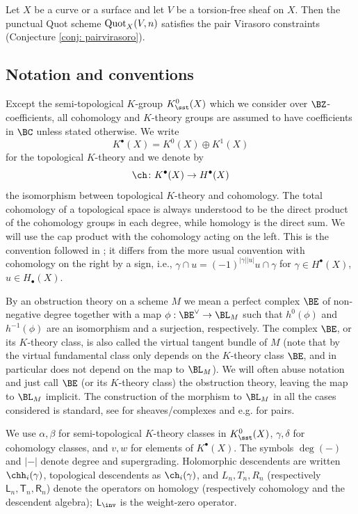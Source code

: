 \begin{theorem}[=Theorem \ref{prop: quot}]
\notready\label{thm: punctualquot}
Let $X$ be a curve or a surface and let $V$ be a torsion-free sheaf on $X$. Then the punctual Quot scheme $\textup{Quot}_X(V, n)$ satisfies the pair Virasoro constraints (Conjecture \ref{conj: pairvirasoro}).
\end{theorem}


\subsection{Notation and conventions}
Except the semi-topological $K$-group $K_\sst^0(X)$ which we consider over $\BZ$-coefficients, all cohomology and $K$-theory groups are assumed to have coefficients in $\BC$ unless stated otherwise. We write
\[K^\bullet(X)=K^0(X)\oplus K^1(X)\]
for the topological $K$-theory and we denote by
\[\ch\colon K^\bullet(X)\to H^\bullet(X)\]
the isomorphism between topological $K$-theory and cohomology. The total cohomology of a topological space is always understood to be the direct product of the cohomology groups in each degree, while homology is the direct sum. We will use the cap product with the cohomology acting on the left. This is the convention followed in \cite{dold}; it differs from the more usual convention with cohomology on the right by a sign, i.e., $\gamma \cap u=(-1)^{|\gamma||u|}u\cap \gamma$ for $\gamma\in H^\bullet(X)$, $u\in H_\bullet(X)$.

By an obstruction theory on a scheme $M$ we mean a perfect complex $\BE$ of non-negative degree together with a map $\phi:\BE^\vee\to \BL_M$ such that $h^0(\phi)$ and $h^{-1}(\phi)$ are an isomorphism and a surjection, respectively. The complex $\BE$, or its $K$-theory class, is also called the virtual tangent bundle of $M$ (note that by \cite{siebert} the virtual fundamental class only depends on the $K$-theory class $\BE$, and in particular does not depend on the map to $\BL_M$). We will often abuse notation and just call $\BE$ (or its $K$-theory class) the obstruction theory, leaving the map to $\BL_M$ implicit. The construction of the morphism to $\BL_M$ in all the cases considered is standard, see \cite{huythomas} for sheaves/complexes and e.g. \cite[Section 5.3]{mochizuki} for pairs.

    \begin{remark}[Notation]
    We use $\alpha,\beta$ for semi-topological $K$-theory classes in
    $K_\sst^0(X)$, $\gamma,\delta$ for cohomology classes, and $v,w$ for
    elements of $K^\bullet(X)$. The symbols $\deg(-)$ and $|-|$ denote
    degree and supergrading. Holomorphic descendents are written
    $\chh_i(\gamma)$, topological descendents as $\ch_i(\gamma)$, and
    $L_n,T_n,R_n$ (respectively $\mathsf L_n,\mathsf T_n,\mathsf R_n$)
    denote the operators on homology (respectively cohomology and the
    descendent algebra); $\mathsf L_{\inv}$ is the weight-zero operator.
    \end{remark}

